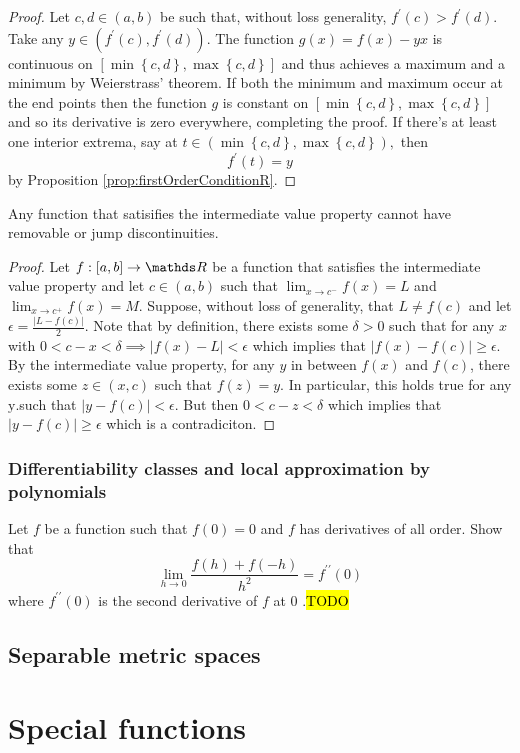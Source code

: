 \begin{proof}
	Let $c,d\in\left(a,b\right)$ be such that, without loss generality,
	$f^{\prime}\left(c\right)>f^{\prime}\left(d\right).$ Take any $y\in\left(f^{\prime}\left(c\right),f^{\prime}\left(d\right)\right)$.
	The function $g\left(x\right)=f\left(x\right)-yx$ is continuous on
	$\left[\min\left\{ c,d\right\} ,\max\left\{ c,d\right\} \right]$
	and thus achieves a maximum and a minimum by Weierstrass' theorem.
	If both the minimum and maximum occur at the end points then the function
	$g$ is constant on $\left[\min\left\{ c,d\right\} ,\max\left\{ c,d\right\} \right]$
	and so its derivative is zero everywhere, completing the proof. If
	there's at least one interior extrema, say at $t\in\left(\min\left\{ c,d\right\} ,\max\left\{ c,d\right\} \right),$
	then
	\[
	f^{\prime}\left(t\right)=y
	\]
	by Proposition \ref{prop:firstOrderConditionR}.
\end{proof}
\begin{lem}
	\label{lem:IVTJump}Any function that satisifies the intermediate
	value property cannot have removable or jump discontinuities.
\end{lem}

\begin{proof}
	Let $f:\left[a,b\right]\to\R$ be a function that satisfies the intermediate
	value property and let $c\in\left(a,b\right)$ such that $\lim_{x\to c^{-}}f\left(x\right)=L$
	and $\lim_{x\to c^{+}}f\left(x\right)=M$. Suppose, without loss of
	generality, that $L\neq f\left(c\right)$ and let $\epsilon=\frac{\lvert L-f\left(c\right)\rvert}{2}.$
	Note that by definition, there exists some $\delta>0$ such that for
	any $x$ with $0<c-x<\delta\implies\lvert f\left(x\right)-L\rvert<\epsilon$
	which implies that $\lvert f\left(x\right)-f\left(c\right)\rvert\geq\epsilon.$
	By the intermediate value property, for any $y$ in between $f\left(x\right)$
	and $f\left(c\right)$, there exists some $z\in\left(x,c\right)$
	such that $f\left(z\right)=y.$ In particular, this holds true for
	any $\text{y}.$such that $\lvert y-f\left(c\right)\rvert<\epsilon.$
	But then $0<c-z<\delta$ which implies that $\lvert y-f\left(c\right)\rvert\geq\epsilon$
	which is a contradiciton.
\end{proof}

\subsubsection{Differentiability classes and local approximation by polynomials}
\begin{example}
	\label{exa:isi2007samplepsb3}Let $f$ be a function such that $f(0)=0$
	and $f$ has derivatives of all order. Show that 
	\[
	\lim_{h\rightarrow0}\frac{f(h)+f(-h)}{h^{2}}=f^{\prime\prime}(0)
	\]
	where $f^{\prime\prime}(0)$ is the second derivative of $f$ at
	0 .\hl{TODO}
\end{example}


\subsection{Separable metric spaces}

\section{Special functions\label{sec:specialFunctions}}
